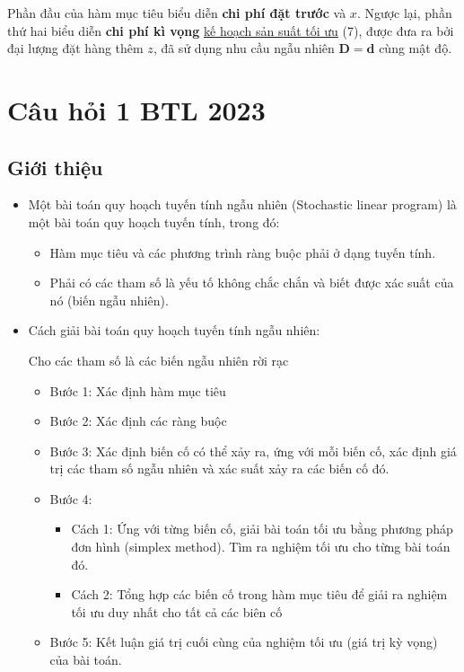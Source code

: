 \documentclass[a4paper]{article}
\begin{document}
    Phần đầu của hàm mục tiêu biểu diễn \textbf{chi phí đặt trước} và $x$. Ngược lại, phần thứ hai biểu diễn \textbf{chi phí kì vọng}
    \underline{kế hoạch sản suất tối ưu} (7), được đưa ra bởi đại lượng đặt hàng thêm $z$, đã sử dụng nhu cầu ngẫu nhiên $\boldsymbol{D=d}$ cùng mật độ.

\section{Câu hỏi 1 BTL 2023}
    \subsection{Giới thiệu}
    \begin{itemize}
        \item Một bài toán quy hoạch tuyến tính ngẫu nhiên (Stochastic linear program) là một bài toán quy hoạch tuyến tính, trong đó:
            \begin{itemize}
                \item Hàm mục tiêu và các phương trình ràng buộc phải ở dạng tuyến tính.
                \item Phải có các tham số là yếu tố không chắc chắn và biết được xác suất của nó (biến ngẫu nhiên).
            \end{itemize}
        \item Cách giải bài toán quy hoạch tuyến tính ngẫu nhiên:
        
        Cho các tham số là các biến ngẫu nhiên rời rạc
            \begin{itemize}
                \item Bước 1: Xác định hàm mục tiêu
                \item Bước 2: Xác định các ràng buộc
                \item Bước 3: Xác định biến cố có thể xảy ra, ứng với mỗi biến cố, xác định giá trị các tham số ngẫu nhiên và xác suất xảy ra các biến cố đó.
                \item Bước 4:
                    \begin{itemize}
                        \item Cách 1: Ứng với từng biến cố, giải bài toán tối ưu bằng phương pháp đơn hình (simplex method). Tìm ra nghiệm tối ưu cho từng bài toán đó.
                        \item Cách 2: Tổng hợp các biến cố trong hàm mục tiêu để giải ra nghiệm tối ưu duy nhất cho tất cả các biên cố
                    \end{itemize}
                \item Bước 5: Kết luận giá trị cuối cùng của nghiệm tối ưu (giá trị kỳ vọng) của bài toán.
            \end{itemize}
    \end{itemize}
\end{document}
